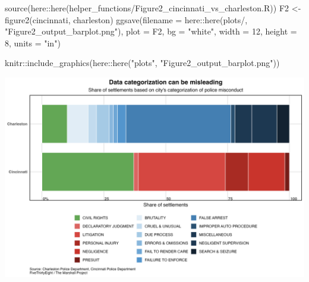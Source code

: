 \documentclass[
  letterpaper,
  DIV=11,
  numbers=noendperiod]{scrartcl}
\newenvironment{Shaded}{\begin{snugshade}}{\end{snugshade}}
\newcommand{\AttributeTok}[1]{\textcolor[rgb]{0.40,0.45,0.13}{#1}}
\newcommand{\DecValTok}[1]{\textcolor[rgb]{0.68,0.00,0.00}{#1}}
\newcommand{\FunctionTok}[1]{\textcolor[rgb]{0.28,0.35,0.67}{#1}}
\newcommand{\NormalTok}[1]{\textcolor[rgb]{0.00,0.23,0.31}{#1}}
\newcommand{\OtherTok}[1]{\textcolor[rgb]{0.00,0.23,0.31}{#1}}
\newcommand{\SpecialCharTok}[1]{\textcolor[rgb]{0.37,0.37,0.37}{#1}}
\newcommand{\StringTok}[1]{\textcolor[rgb]{0.13,0.47,0.30}{#1}}
\begin{document}
\begin{Shaded}
\begin{Highlighting}[]
\FunctionTok{source}\NormalTok{(here}\SpecialCharTok{::}\FunctionTok{here}\NormalTok{(}\StringTok{\textquotesingle{}helper\_functions/Figure2\_cincinnati\_vs\_charleston.R\textquotesingle{}}\NormalTok{))}
\NormalTok{F2 }\OtherTok{\textless{}{-}} \FunctionTok{figure2}\NormalTok{(cincinnati, charleston)}
\FunctionTok{ggsave}\NormalTok{(}\AttributeTok{filename =}\NormalTok{ here}\SpecialCharTok{::}\FunctionTok{here}\NormalTok{(}\StringTok{\textquotesingle{}plots/\textquotesingle{}}\NormalTok{, }\StringTok{"Figure2\_output\_barplot.png"}\NormalTok{),}
       \AttributeTok{plot =}\NormalTok{ F2, }
       \AttributeTok{bg =} \StringTok{"white"}\NormalTok{, }\AttributeTok{width =} \DecValTok{12}\NormalTok{, }\AttributeTok{height =} \DecValTok{8}\NormalTok{, }\AttributeTok{units =} \StringTok{"in"}\NormalTok{)}

\NormalTok{knitr}\SpecialCharTok{::}\FunctionTok{include\_graphics}\NormalTok{(here}\SpecialCharTok{::}\FunctionTok{here}\NormalTok{(}\StringTok{"plots"}\NormalTok{, }\StringTok{"Figure2\_output\_barplot.png"}\NormalTok{))}
\end{Highlighting}
\end{Shaded}

\includegraphics{plots/Figure2_output_barplot.png}
\end{document}
